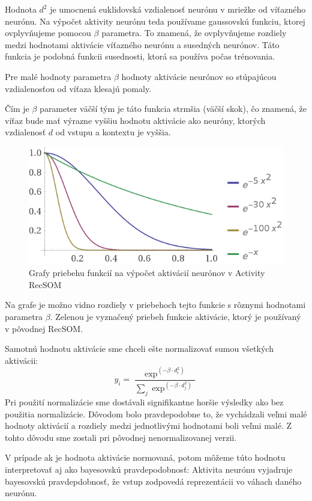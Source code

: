 Hodnota $d^2$ je umocnená euklidovská vzdialenosť neurónu v mriežke od víťazného neurónu.
Na výpočet aktivity neurónu teda používame gaussovskú funkciu, ktorej  ovplyvňujeme
pomocou $\beta$ parametra. To znamená, že ovplyvňujeme rozdiely medzi hodnotami aktivácie víťazného neurónu
a susedných neurónov. Táto funkcia je podobná funkcii susednosti, ktorá sa používa počas trénovania. 

Pre malé hodnoty parametra $\beta$ hodnoty aktivácie neurónov so stúpajúcou vzdialenosťou od víťaza
klesajú pomaly. 

Čím je $\beta$ parameter väčší tým je táto funkcia strmšia (väčší skok), čo znamená, že víťaz bude mať výrazne vyššiu hodnotu aktivácie
ako neuróny, ktorých vzdialenosť $d$ od vstupu a kontextu je vyššia.

\begin{figure}[H]
    \centering
    \includegraphics[width=\textwidth]{assets/plots}
    \caption{Grafy priebehu funkcií na výpočet aktivácií neurónov v Activity RecSOM}
\end{figure}
Na grafe je možno vidno rozdiely v priebehoch tejto funkcie s rôznymi hodnotami parametra $\beta$. Zelenou 
je vyznačený priebeh funkcie aktivácie, ktorý je používaný v pôvodnej RecSOM.

Samotnú hodnotu aktivácie sme chceli ešte normalizovať sumou všetkých aktivácii:
\begin{equation}
    y_{i} = \frac{\exp^{(-\beta \cdot d_{i}^{2})}}{\sum_{j} \exp^{(-\beta \cdot d_{j}^{2})}}
\end{equation}
Pri použití normalizácie sme dostávali signifikantne horšie výsledky
ako bez použitia normalizácie. Dôvodom bolo pravdepodobne to, že vychádzali veľmi malé
hodnoty aktivácií a rozdiely medzi jednotlivými hodnotami boli veľmi malé. Z tohto dôvodu sme zostali 
pri pôvodnej nenormalizovanej verzii.

V prípade ak je hodnota aktivácie normovaná, potom môžeme túto
hodnotu interpretovať aj ako bayesovskú pravdepodobnosť:
Aktivita neurónu vyjadruje bayesovskú pravdepdobnosť, že vstup zodpovedá reprezentácii vo váhach daného neurónu.

